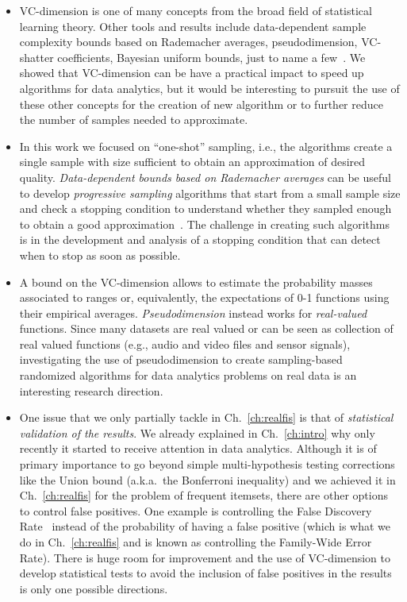 \begin{itemize}
  \item VC-dimension is one of many concepts from the broad field of statistical
learning theory. Other tools and results include data-dependent sample
complexity bounds based on Rademacher averages, pseudodimension, VC-shatter
coefficients, Bayesian uniform bounds, just to name a
few~\citep{BoucheronBL05,AnthonyB99,DevroyeGL96}. We showed that VC-dimension
can be have a practical impact to speed up algorithms for data analytics, but it
would be interesting to pursuit the use of these other concepts for the creation
of new algorithm or to further reduce the number of samples needed to
approximate. 

\item In this work we focused on ``one-shot'' sampling, i.e., the algorithms create a
single sample with size sufficient to obtain an approximation of desired
quality. \emph{Data-dependent bounds based on Rademacher averages} can be
useful to develop \emph{progressive sampling} algorithms that start from a small
sample size and check a stopping condition to understand whether they sampled
enough to obtain a good approximation~\citep{ElomaaK02,Kaariainen04}. The
challenge in creating such algorithms is in the development and analysis of a
stopping condition that can detect when to stop as soon as possible.  

\item A bound on the VC-dimension allows to estimate the probability masses associated
to ranges or, equivalently, the expectations of 0-1 functions
using their empirical averages. \emph{Pseudodimension} instead works for
\emph{real-valued} functions. Since many datasets are real valued or can be seen
as collection of real valued functions (e.g., audio and video files and sensor
signals), investigating the use of pseudodimension to create sampling-based
randomized algorithms for data analytics problems on real data is an interesting
research direction.

\item One issue that we only partially tackle in Ch.~\ref{ch:realfis} is that of
\emph{statistical validation of the results}. We already explained in
Ch.~\ref{ch:intro} why only recently it started to receive attention in data
analytics. Although it is of primary importance to go beyond
simple multi-hypothesis testing corrections like the Union bound (a.k.a.~the
Bonferroni inequality) and we achieved it in Ch.~\ref{ch:realfis} for the
problem of frequent itemsets, there are other options to control false
positives. One example is controlling the False Discovery
Rate~\citep{BenjaminiH95} instead of the probability of having a false positive
(which is what we do in Ch.~\ref{ch:realfis} and is known as controlling the
Family-Wide Error Rate). There is huge room for improvement and the use of
VC-dimension to develop statistical tests to avoid the inclusion of false
positives in the results is only one possible directions. 


\end{itemize}
